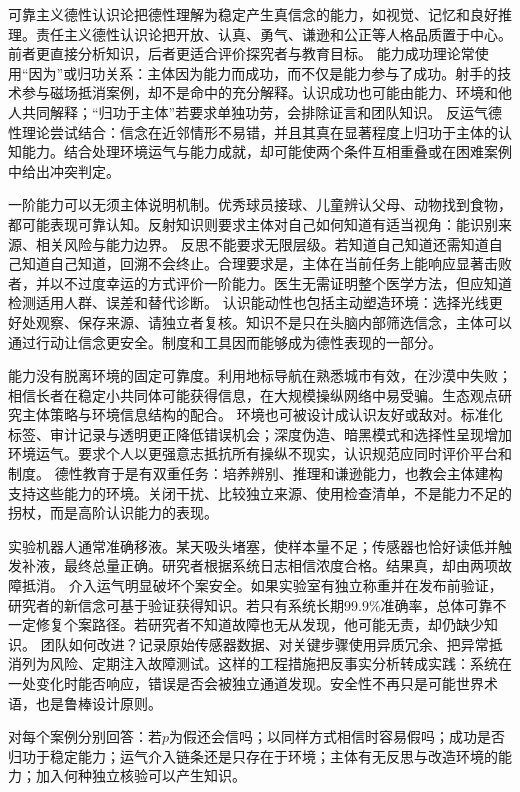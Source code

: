 可靠主义德性认识论把德性理解为稳定产生真信念的能力，如视觉、记忆和良好推理。责任主义德性认识论把开放、认真、勇气、谦逊和公正等人格品质置于中心\parencite{zagzebski1996}。前者更直接分析知识，后者更适合评价探究者与教育目标。 能力成功理论常使用“因为”或归功关系：主体因为能力而成功，而不仅是能力参与了成功。射手的技术参与磁场抵消案例，却不是命中的充分解释。认识成功也可能由能力、环境和他人共同解释；“归功于主体”若要求单独功劳，会排除证言和团队知识。 反运气德性理论尝试结合：信念在近邻情形不易错，并且其真在显著程度上归功于主体的认知能力\parencite{pritchard2012}。结合处理环境运气与能力成就，却可能使两个条件互相重叠或在困难案例中给出冲突判定。

一阶能力可以无须主体说明机制。优秀球员接球、儿童辨认父母、动物找到食物，都可能表现可靠认知。反射知识则要求主体对自己如何知道有适当视角：能识别来源、相关风险与能力边界。 反思不能要求无限层级。若知道自己知道还需知道自己知道自己知道，回溯不会终止。合理要求是，主体在当前任务上能响应显著击败者，并以不过度幸运的方式评价一阶能力。医生无需证明整个医学方法，但应知道检测适用人群、误差和替代诊断。 认识能动性也包括主动塑造环境：选择光线更好处观察、保存来源、请独立者复核。知识不是只在头脑内部筛选信念，主体可以通过行动让信念更安全。制度和工具因而能够成为德性表现的一部分。

能力没有脱离环境的固定可靠度。利用地标导航在熟悉城市有效，在沙漠中失败；相信长者在稳定小共同体可能获得信息，在大规模操纵网络中易受骗。生态观点研究主体策略与环境信息结构的配合。 环境也可被设计成认识友好或敌对。标准化标签、审计记录与透明更正降低错误机会；深度伪造、暗黑模式和选择性呈现增加环境运气。要求个人以更强意志抵抗所有操纵不现实，认识规范应同时评价平台和制度。 德性教育于是有双重任务：培养辨别、推理和谦逊能力，也教会主体建构支持这些能力的环境。关闭干扰、比较独立来源、使用检查清单，不是能力不足的拐杖，而是高阶认识能力的表现。

实验机器人通常准确移液。某天吸头堵塞，使样本量不足；传感器也恰好读低并触发补液，最终总量正确。研究者根据系统日志相信浓度合格。结果真，却由两项故障抵消。 介入运气明显破坏个案安全。如果实验室有独立称重并在发布前验证，研究者的新信念可基于验证获得知识。若只有系统长期99.9\%准确率，总体可靠不一定修复个案路径。若研究者不知道故障也无从发现，他可能无责，却仍缺少知识。 团队如何改进？记录原始传感器数据、对关键步骤使用异质冗余、把异常抵消列为风险、定期注入故障测试。这样的工程措施把反事实分析转成实践：系统在一处变化时能否响应，错误是否会被独立通道发现。安全性不再只是可能世界术语，也是鲁棒设计原则。

\begin{tcolorbox}[breakable,colback=white,colframe=blue!30!black,title={反运气比较表},fonttitle=\bfseries]
对每个案例分别回答：若$p$为假还会信吗；以同样方式相信时容易假吗；成功是否归功于稳定能力；运气介入链条还是只存在于环境；主体有无反思与改造环境的能力；加入何种独立核验可以产生知识。
\end{tcolorbox}

